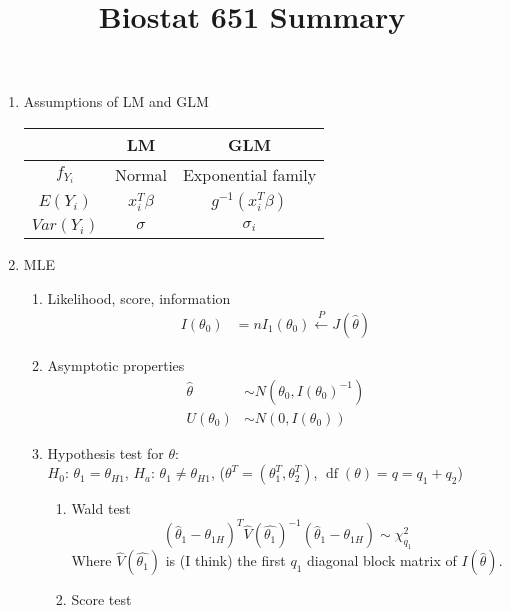 \message{ !name(biostat651_summary.tex)}\documentclass{amsart}
\title{Biostat 651 Summary}
\begin{document}


\maketitle

\begin{enumerate}
\item Assumptions of LM and GLM
  \begin{center}
    \begin{tabular}{|c|c|c|}
      \hline
      & LM & GLM \\
      \hline
      $f_{Y_i}$ & Normal & Exponential family \\
      \hline
      $E(Y_i)$ & $x_i^T \beta$ & $g^{-1}(x_i^T \beta)$ \\
      \hline
      $Var(Y_i)$ & $\sigma$ & $\sigma_i$ \\
      \hline
    \end{tabular}
  \end{center}
\item MLE
  \begin{enumerate}
  \item Likelihood, score, information
    \begin{align*}
      I(\theta_0) & = n I_1(\theta_0) \overset{P}{\longleftarrow} J(\hat{\theta}) 
    \end{align*}
  \item Asymptotic properties
    \begin{align*}
      \hat{\theta} & \sim N(\theta_0 , I(\theta_0)^{-1}) \\
      U(\theta_0) & \sim N(0, I(\theta_0)) 
    \end{align*}
  \item Hypothesis test for $\theta$: \\
    $H_0$: $\theta_1 = \theta_{H1}$, $H_a$:
    $\theta_1 \neq \theta_{H1}$,
    ($\theta^T = (\theta_1^T, \theta_2^T)$,
    $\operatorname{df}(\theta) = q = q_1 + q_2$)
    \begin{enumerate}
    \item Wald test
      \begin{equation*}
        (\hat{\theta}_1 - \theta_{1H})^T \hat{V}(\hat{\theta_1})^{-1}
        (\hat{\theta}_1 - \theta_{1H}) \sim \chi^2_{q_1}
      \end{equation*}
      Where $\hat{V}(\hat{\theta_1})$ is (I think) the first $q_1$
      diagonal block matrix of $I(\hat{\theta})$.
    \item Score test

\end{enumerate}
\end{enumerate}
\end{enumerate}
\end{document}
